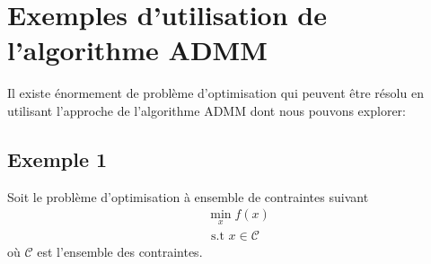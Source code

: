 \documentclass[12pt,a4paper]{report}
\begin{document}
	\section{Exemples d'utilisation de l'algorithme ADMM}
    	Il existe énormement de problème d'optimisation qui peuvent être résolu en utilisant l'approche de l'algorithme ADMM dont nous pouvons explorer:
        	\subsection*{Exemple 1}
            	Soit le problème d'optimisation à ensemble de contraintes suivant
            	\begin{equation*}
                	\begin{aligned}
                    	& \min_{x} f(x) \\
                    	& \text{ s.t  $x \in \mathcal{C}$ }
                	\end{aligned}
            	\end{equation*}
            	où $\mathcal{C}$ est l'ensemble des contraintes.
           	 
\end{document}
